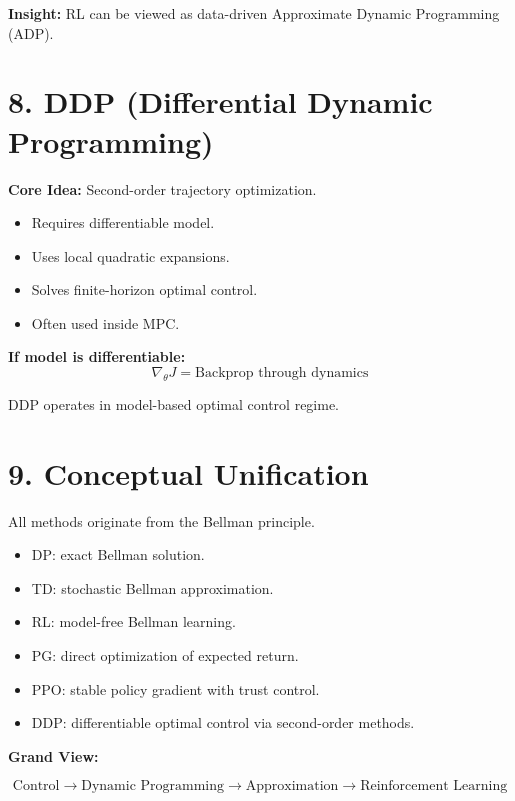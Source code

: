 \documentclass[11pt]{article}
\begin{document}
\textbf{Insight:}
RL can be viewed as data-driven Approximate Dynamic Programming (ADP).

\vspace{1em}

\section*{8. DDP (Differential Dynamic Programming)}

\textbf{Core Idea:} Second-order trajectory optimization.

\begin{itemize}
\item Requires differentiable model.
\item Uses local quadratic expansions.
\item Solves finite-horizon optimal control.
\item Often used inside MPC.
\end{itemize}

\textbf{If model is differentiable:}
\[
\nabla_\theta J = \text{Backprop through dynamics}
\]

DDP operates in model-based optimal control regime.

\vspace{1em}

\section*{9. Conceptual Unification}

All methods originate from the Bellman principle.

\begin{itemize}
\item DP: exact Bellman solution.
\item TD: stochastic Bellman approximation.
\item RL: model-free Bellman learning.
\item PG: direct optimization of expected return.
\item PPO: stable policy gradient with trust control.
\item DDP: differentiable optimal control via second-order methods.
\end{itemize}

\textbf{Grand View:}

\[
\text{Control} \rightarrow \text{Dynamic Programming} \rightarrow
\text{Approximation} \rightarrow \text{Reinforcement Learning}
\]
\end{document}
